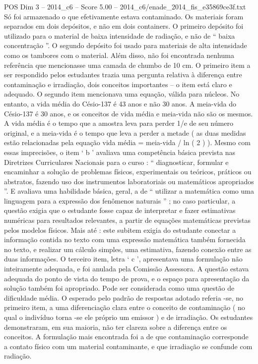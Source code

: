 \begin{textsample}{POS Dim 3 – 2014\_c6 – Score 5.00 – 2014\_c6/enade\_2014\_fis\_e35869ce3f.txt}
Só foi armazenado o que efetivamente estava contaminado.
Os materiais foram separados em dois depósitos, e não em dois containers.
O primeiro depósito foi utilizado para o material de baixa intensidade de radiação, e não de “ baixa concentração ”.
O segundo depósito foi usado para materiais de alta intensidade como os tambores com o material.
Além disso, não foi encontrada nenhuma referência que mencionasse uma camada de chumbo de 10 cm.
O primeiro item a ser respondido pelos estudantes trazia uma pergunta relativa à diferença entre contaminação e irradiação, dois conceitos importantes – o item está claro e adequado.
O segundo item mencionava uma equação, válida para núcleos.
No entanto, a vida média do Césio-137 é 43 anos e não 30 anos.
A meia-vida do Césio-137 é 30 anos, e os conceitos de vida média e meia-vida não são os mesmos.
A vida média é o tempo que a amostra leva para perder 1/e de seu número original, e a meia-vida é o tempo que leva a perder a metade ( as duas medidas estão relacionadas pela equação vida média = meia-vida / ln ( 2 ) ).
Mesmo com essas imprecisões, o item ‘ b ’ avaliava uma competência básica prevista nas Diretrizes Curriculares Nacionais para o curso : “ diagnosticar, formular e encaminhar a solução de problemas físicos, experimentais ou teóricos, práticos ou abstratos, fazendo uso dos instrumentos laboratoriais ou matemáticos apropriados ”.
E avaliava uma habilidade básica, geral, a de “ utilizar a matemática como uma linguagem para a expressão dos fenômenos naturais ” ; no caso particular, a questão exigia que o estudante fosse capaz de interpretar e fazer estimativas numéricas para resultados relevantes, a partir de equações matemáticas previstas pelos modelos físicos.
Mais até : este subitem exigia do estudante conectar a informação contida no texto com uma expressão matemática também fornecida no texto, e realizar um cálculo simples, uma estimativa, fazendo conexão entre as duas informações.
O terceiro item, letra ‘ c ’, apresentava uma formulação não inteiramente adequada, e foi anulada pela Comissão Assessora.
A questão estava adequada do ponto de vista do tempo de prova, e o espaço para apresentação da solução também foi apropriado.
Pode ser considerada como uma questão de dificuldade média.
O esperado pelo padrão de respostas adotado referia -se, no primeiro item, a uma diferenciação clara entre o conceito de contaminação ( no qual o indivíduo torna -se ele próprio um emissor ) e de irradiação.
Os estudantes demonstraram, em sua maioria, não ter clareza sobre a diferença entre os conceitos.
A formulação mais encontrada foi a de que contaminação corresponde a contato físico com um material contaminante, e que irradiação se confunde com radiação.

\end{textsample}
